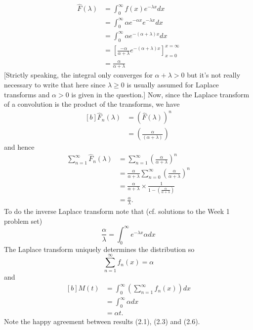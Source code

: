 \documentclass[11pt,a4paper]{article}
\begin{document}
\begin{enumerate}
\begin{enumerate}
\begin{align*}
        \hat{F}(\lambda)
        &= \int_0^\infty f(x)e^{-\lambda x}dx\\
        &= \int_0^\infty \alpha e^{-\alpha x}e^{-\lambda x}dx\\
        &= \int_0^\infty \alpha e^{-(\alpha + \lambda)x}dx\\
        &= \left[\frac{-\alpha}{\alpha + \lambda}e^{-(\alpha + \lambda)x}\right]_{x = 0}^{x = \infty}\\
        &= \frac{\alpha}{\alpha + \lambda}
      \end{align*}
      [Strictly speaking, the integral only converges for $\alpha + \lambda > 0$ but it's not really necessary to write that here since $\lambda \geq 0$ is usually assumed for Laplace transforms and $\alpha > 0$ is given in the question.] Now, since the Laplace transform of a convolution is the product of the transforms, we have
      \begin{equation}\tag{2.4}
        \begin{aligned}[b]
          \hat{F}_n(\lambda) 
          &= (\hat{F}(\lambda))^n\\
          &= \left(\frac{\alpha}{(\alpha + \lambda)}\right)
        \end{aligned}
      \end{equation}
      and hence
      \begin{align*}
        \sum_{n = 1}^\infty\hat{F}_n(\lambda)
        &= \sum_{n = 1}^\infty \left(\frac{\alpha}{\alpha + \lambda}\right)^n\\
        &= \frac{\alpha}{\alpha + \lambda}\sum_{n = 0}^\infty\left(\frac{\alpha}{\alpha + \lambda}\right)^n\\
        &= \frac{\alpha}{\alpha + \lambda}\times \frac{1}{1 - \left(\frac{\alpha}{\alpha + \lambda}\right)}\\
        &= \frac{\alpha}{\lambda}.
      \end{align*}
      To do the inverse Laplace transform note that (cf. solutions to the Week 1 problem set)
      \begin{equation}\tag{2.5}
        \frac{\alpha}{\lambda} = \int_0^\infty e^{-\lambda x}\alpha dx
      \end{equation}
      The Laplace transform uniquely determines the distribution so
      $$
      \sum_{n = 1}^\infty f_n(x) = \alpha
      $$
      and
      \begin{equation}\tag{2.6}
        \begin{aligned}[b]
          M(t)
          &= \int_0^\infty\left(\sum_{n = 1}^\infty f_n(x)\right)dx\\
          &= \int_0^\infty \alpha dx\\
          &= \alpha t.
        \end{aligned}
      \end{equation}
      Note the happy agreement between results (2.1), (2.3) and (2.6).
    \end{enumerate}
  \end{enumerate}
\end{document}
